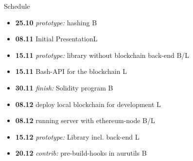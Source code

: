 \documentclass{beamer}
\begin{document}
\begin{frame}{Schedule}
	\begin{itemize}
		\item \textbf{25.10} \emph{prototype:} hashing \hfill B
		\item \textbf{08.11} \alert{Initial Presentation}\hfill L
		\item \textbf{15.11} \emph{prototype:} library without blockchain back-end \hfill B/L
		\item \textbf{15.11} Bash-API for the blockchain \hfill L
		\item \textbf{30.11} \emph{finish:} \alert{Solidity program} \hfill B
		\item \textbf{08.12} deploy local blockchain for development \hfill L
		\item \textbf{08.12} running server with ethereum-node \hfill B/L
		\item \textbf{15.12} \emph{prototype:} \alert{Library} incl. back-end \hfill L
		\item \textbf{20.12} \emph{contrib:} pre-build-hooks in aurutils \hfill B
	\end{itemize}
\end{frame}
\end{document}
